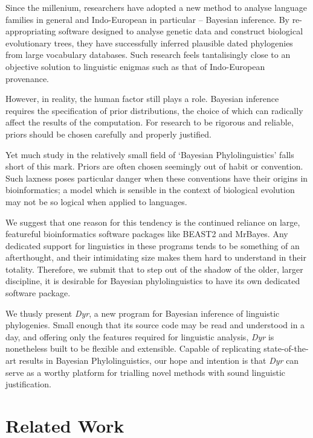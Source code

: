 \documentclass[10pt,journal,compsoc]{IEEEtran}
\begin{document}
Since the millenium, researchers have adopted a new method to analyse language families in general and Indo-European in particular -- Bayesian inference. By re-appropriating software designed to analyse genetic data and construct biological evolutionary trees, they have successfully inferred plausible dated phylogenies from large vocabulary databases. Such research feels tantalisingly close to an objective solution to linguistic enigmas such as that of Indo-European provenance.

However, in reality, the human factor still plays a role. Bayesian inference requires the specification of prior distributions, the choice of which can radically affect the results of the computation. For research to be rigorous and reliable, priors should be chosen carefully and properly justified.

Yet much study in the relatively small field of `Bayesian Phylolinguistics' falls short of this mark. Priors are often chosen seemingly out of habit or convention. Such laxness poses particular danger when these conventions have their origins in bioinformatics; a model which is sensible in the context of biological evolution may not be so logical when applied to languages.

We suggest that one reason for this tendency is the continued reliance on large, featureful bioinformatics software packages like BEAST2 and MrBayes. Any dedicated support for linguistics in these programs tends to be something of an afterthought, and their intimidating size makes them hard to understand in their totality. Therefore, we submit that to step out of the shadow of the older, larger discipline, it is desirable for Bayesian phylolinguistics to have its own dedicated software package.

We thusly present \textit{Dyr}, a new program for Bayesian inference of linguistic phylogenies. Small enough that its source code may be read and understood in a day, and offering only the features required for linguistic analysis, \textit{Dyr} is nonetheless built to be flexible and extensible. Capable of replicating state-of-the-art results in Bayesian Phylolinguistics, our hope and intention is that \textit{Dyr} can serve as a worthy platform for trialling novel methods with sound linguistic justification.

\section{Related Work}
\end{document}
